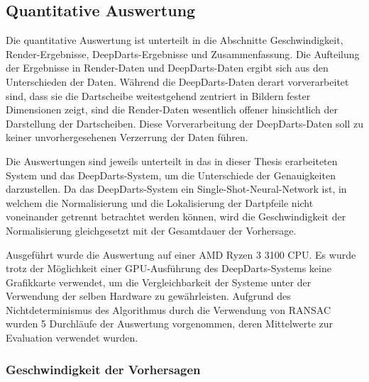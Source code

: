 
\subsection{Quantitative Auswertung}
\label{sec:cv_quantitative_auswertung}

Die quantitative Auswertung ist unterteilt in die Abschnitte Geschwindigkeit, Render-Ergebnisse, DeepDarts-Ergebnisse und Zusammenfassung. Die Aufteilung der Ergebnisse in Render-Daten und DeepDarts-Daten ergibt sich aus den Unterschieden der Daten. Während die DeepDarts-Daten derart vorverarbeitet sind, dass sie die Dartscheibe weitestgehend zentriert in Bildern fester Dimensionen zeigt, sind die Render-Daten wesentlich offener hinsichtlich der Darstellung der Dartscheiben. Diese Vorverarbeitung der DeepDarts-Daten soll zu keiner unvorhergesehenen Verzerrung der Daten führen.

Die Auswertungen sind jeweils unterteilt in das in dieser Thesis erarbeiteten System und das DeepDarts-System, um die Unterschiede der Genauigkeiten darzustellen. Da das DeepDarts-System ein Single-Shot-Neural-Network ist, in welchem die Normalisierung und die Lokalisierung der Dartpfeile nicht voneinander getrennt betrachtet werden können, wird die Geschwindigkeit der Normalisierung gleichgesetzt mit der Gesamtdauer der Vorhersage.

Ausgeführt wurde die Auswertung auf einer AMD Ryzen 3 3100 CPU. Es wurde trotz der Möglichkeit einer GPU-Ausführung des DeepDarts-Systems keine Grafikkarte verwendet, um die Vergleichbarkeit der Systeme unter der Verwendung der selben Hardware zu gewährleisten. Aufgrund des Nichtdeterminismus des Algorithmus durch die Verwendung von RANSAC wurden 5 Durchläufe der Auswertung vorgenommen, deren Mittelwerte zur Evaluation verwendet wurden.

\subsubsection{Geschwindigkeit der Vorhersagen} %

\ExecutionTimes

